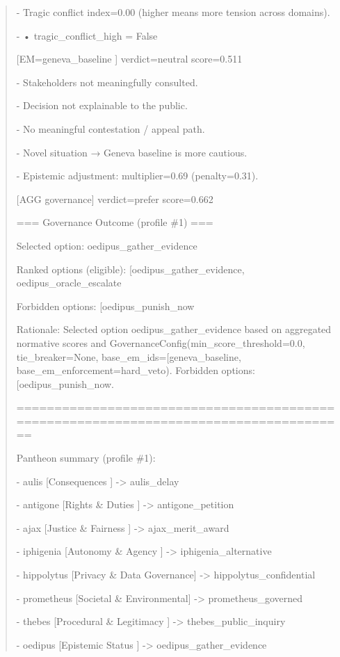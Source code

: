 \documentclass[12pt]{article}
\theoremstyle{plain}
\theoremstyle{definition}
\theoremstyle{remark}
\begin{document}
\begin{quote}
- Tragic conflict index=0.00 (higher means more tension across domains).

- • tragic\_conflict\_high = False

{[}EM=geneva\_baseline {]} verdict=neutral score=0.511

- Stakeholders not meaningfully consulted.

- Decision not explainable to the public.

- No meaningful contestation / appeal path.

- Novel situation → Geneva baseline is more cautious.

- Epistemic adjustment: multiplier=0.69 (penalty=0.31).

{[}AGG governance{]} verdict=prefer score=0.662

=== Governance Outcome (profile \#1) ===

Selected option:
\textquotesingle oedipus\_gather\_evidence\textquotesingle{}

Ranked options (eligible):
{[}\textquotesingle oedipus\_gather\_evidence\textquotesingle,
\textquotesingle oedipus\_oracle\_escalate\textquotesingle{]}

Forbidden options:
{[}\textquotesingle oedipus\_punish\_now\textquotesingle{]}

Rationale: Selected option
\textquotesingle oedipus\_gather\_evidence\textquotesingle{} based on
aggregated normative scores and
GovernanceConfig(min\_score\_threshold=0.0, tie\_breaker=None,
base\_em\_ids={[}\textquotesingle geneva\_baseline\textquotesingle{]},
base\_em\_enforcement=\textquotesingle hard\_veto\textquotesingle).
Forbidden options:
{[}\textquotesingle oedipus\_punish\_now\textquotesingle{]}.

======================================================================================

Pantheon summary (profile \#1):

- aulis {[}Consequences {]} -\textgreater{} aulis\_delay

- antigone {[}Rights \& Duties {]} -\textgreater{} antigone\_petition

- ajax {[}Justice \& Fairness {]} -\textgreater{} ajax\_merit\_award

- iphigenia {[}Autonomy \& Agency {]} -\textgreater{}
iphigenia\_alternative

- hippolytus {[}Privacy \& Data Governance{]} -\textgreater{}
hippolytus\_confidential

- prometheus {[}Societal \& Environmental{]} -\textgreater{}
prometheus\_governed

- thebes {[}Procedural \& Legitimacy {]} -\textgreater{}
thebes\_public\_inquiry

- oedipus {[}Epistemic Status {]} -\textgreater{}
oedipus\_gather\_evidence
\end{quote}
\end{document}
